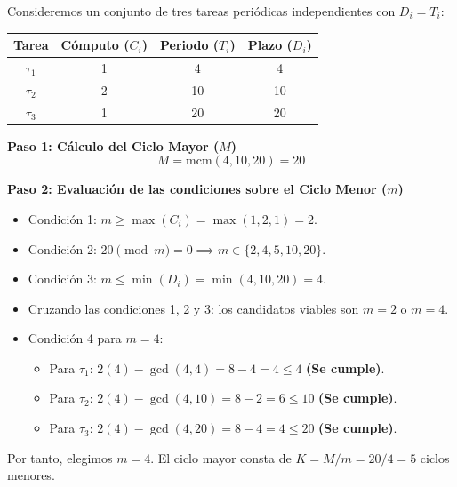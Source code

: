\begin{ejemplo}
Consideremos un conjunto de tres tareas periódicas independientes con $D_i = T_i$:
\begin{center}
\begin{tabular}{cccc}
\toprule
\textbf{Tarea} & \textbf{Cómputo ($C_i$)} & \textbf{Periodo ($T_i$)} & \textbf{Plazo ($D_i$)} \\
\midrule
$\tau_1$ & 1 & 4 & 4 \\
$\tau_2$ & 2 & 10 & 10 \\
$\tau_3$ & 1 & 20 & 20 \\
\bottomrule
\end{tabular}
\end{center}

\textbf{Paso 1: Cálculo del Ciclo Mayor ($M$)}
$$M = \text{mcm}(4, 10, 20) = 20$$

\textbf{Paso 2: Evaluación de las condiciones sobre el Ciclo Menor ($m$)}
\begin{itemize}
    \item Condición 1: $m \ge \max(C_i) = \max(1, 2, 1) = 2$.
    \item Condición 2: $20 \pmod m = 0 \implies m \in \{2, 4, 5, 10, 20\}$.
    \item Condición 3: $m \le \min(D_i) = \min(4, 10, 20) = 4$.
    \item Cruzando las condiciones 1, 2 y 3: los candidatos viables son $m = 2$ o $m = 4$.
    \item Condición 4 para $m = 4$:
    \begin{itemize}
        \item Para $\tau_1$: $2(4) - \gcd(4, 4) = 8 - 4 = 4 \le 4$ \textbf{(Se cumple)}.
        \item Para $\tau_2$: $2(4) - \gcd(4, 10) = 8 - 2 = 6 \le 10$ \textbf{(Se cumple)}.
        \item Para $\tau_3$: $2(4) - \gcd(4, 20) = 8 - 4 = 4 \le 20$ \textbf{(Se cumple)}.
    \end{itemize}
\end{itemize}
Por tanto, elegimos $m = 4$. El ciclo mayor consta de $K = M / m = 20 / 4 = 5$ ciclos menores.


\end{ejemplo}
